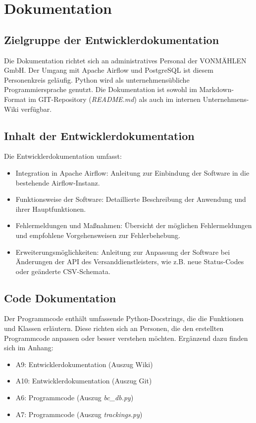 \section{Dokumentation}
\label{sec:Dokumentation}


\subsection{Zielgruppe der Entwicklerdokumentation}
\label{sec:ZielgruppeDoku}

Die Dokumentation richtet sich an administratives Personal der VONMÄHLEN GmbH. 
Der Umgang mit Apache Airflow und PostgreSQL ist diesem Personenkreis geläufig. 
Python wird als unternehmensübliche Programmiersprache genutzt. Die Dokumentation ist 
sowohl im Markdown-Format im GIT-Repository (\textit{README.md}) als auch im internen Unternehmens-Wiki verfügbar.

\subsection{Inhalt der Entwicklerdokumentation}
\label{sec:Entwicklerdokumentation}

Die Entwicklerdokumentation umfasst:
\begin{itemize}
    \item Integration in Apache Airflow: Anleitung zur Einbindung der Software in die bestehende Airflow-Instanz.
    \item Funktionsweise der Software: Detaillierte Beschreibung der Anwendung und ihrer Hauptfunktionen.
    \item Fehlermeldungen und Maßnahmen: Übersicht der möglichen Fehlermeldungen und empfohlene Vorgehensweisen zur Fehlerbehebung.
    \item Erweiterungsmöglichkeiten: Anleitung zur Anpassung der Software bei Änderungen der API des Versanddienstleisters, 
    wie z.B. neue Status-Codes oder geänderte CSV-Schemata.
\end{itemize}
\clearpage

\subsection{Code Dokumentation}
\label{sec:CodeDokumentation}

Der Programmcode enthält umfassende Python-Docstrings, die die Funktionen und Klassen erläutern. 
Diese richten sich an Personen, die den erstellten Programmcode anpassen oder besser verstehen möchten. 
Ergänzend dazu finden sich im Anhang:
\begin{itemize}
    \item A9: Entwicklerdokumentation (Auszug Wiki)
    \item A10: Entwicklerdokumentation (Auszug Git)
    \item A6: Programmcode (Auszug \textit{bc\_db.py})
    \item A7: Programmcode (Auszug \textit{trackings.py})
\end{itemize}
